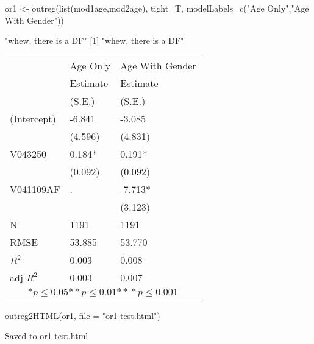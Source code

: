 \begin{Schunk}
\begin{Sinput}
 or1 <- outreg(list(mod1age,mod2age), tight=T, modelLabels=c("Age Only","Age With Gender"))
\end{Sinput}
\begin{Soutput}
[1] "whew, there is a DF"
[1] "whew, there is a DF"
\begin{tabular}{*{3}{l}}
\hline
                  & Age Only & Age With Gender   \tabularnewline
                   &Estimate   &Estimate \tabularnewline
                 &(S.E.)   &(S.E.) \tabularnewline
 \hline
 \hline
   (Intercept)     &-6.841 &-3.085 \tabularnewline
                 &(4.596)   &(4.831)  \tabularnewline
   V043250         &0.184* &0.191* \tabularnewline
                 &(0.092)   &(0.092)  \tabularnewline
   V041109AF         & .      &-7.713* \tabularnewline
                 &         &(3.123)  \tabularnewline
 \hline
 N                 &1191       &1191       \tabularnewline
 RMSE             &53.885   &53.770   \tabularnewline
 $R^2$             &0.003   &0.008   \tabularnewline
 adj $R^2$         &0.003   &0.007   \tabularnewline
 \hline
\hline
 
 \multicolumn{3}{c}{${*  p}\le 0.05$${*\!\!*  p}\le 0.01$${*\!\!*\!\!*  p}\le 0.001$}\tabularnewline
 \end{tabular}
\end{Soutput}
\begin{Sinput}
 outreg2HTML(or1, file = "or1-test.html")
\end{Sinput}
\begin{Soutput}
Saved to  or1-test.html 
\end{Soutput}
\end{Schunk}
